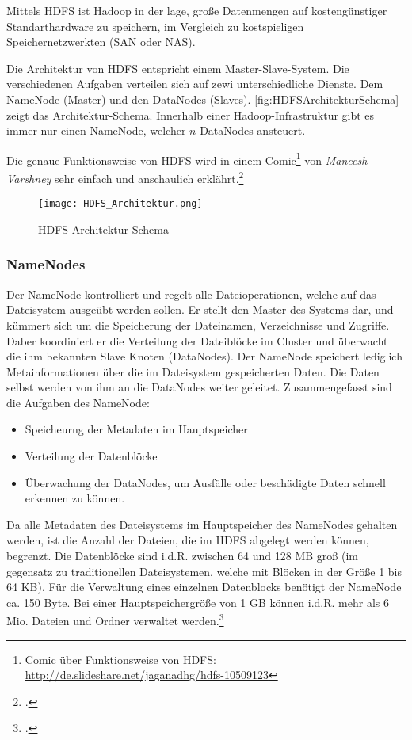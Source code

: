 Mittels \ac{HDFS} ist Hadoop in der lage, große Datenmengen auf kostengünstiger Standarthardware zu speichern, im Vergleich zu kostspieligen Speichernetzwerkten (\ac{SAN} oder \ac{NAS}). 

Die Architektur von \ac{HDFS} entspricht einem Master-Slave-System. Die verschiedenen Aufgaben verteilen sich auf zewi unterschiedliche Dienste. Dem NameNode (Master) und den DataNodes (Slaves). \autoref{fig:HDFSArchitekturSchema} zeigt das Architektur-Schema. Innerhalb einer Hadoop-Infrastruktur gibt es immer nur einen NameNode, welcher $n$ DataNodes ansteuert.

Die genaue Funktionsweise von \ac{HDFS} wird in einem Comic\footnote{Comic über Funktionsweise von HDFS: \\ \url{http://de.slideshare.net/jaganadhg/hdfs-10509123}} von \textit{Maneesh Varshney} sehr einfach und anschaulich erklährt.\footcite[Vgl.][S. 22 f.]{Wartala.2012}

\begin{figure}[h]
	\centering
	\texttt{[image: HDFS\_Architektur.png]}
	\caption{HDFS Architektur-Schema\footnotemark}
	\label{fig:HDFSArchitekturSchema}
\end{figure}

\subsubsection{NameNodes}
Der NameNode kontrolliert und regelt alle Dateioperationen, welche auf das Dateisystem ausgeübt werden sollen. Er stellt den Master des Systems dar, und kümmert sich um die Speicherung der Dateinamen, Verzeichnisse und Zugriffe. Daber koordiniert er die Verteilung der Dateiblöcke im Cluster und überwacht die ihm bekannten Slave Knoten (DataNodes). Der NameNode speichert lediglich Metainformationen über die im Dateisystem gespeicherten Daten. Die Daten selbst werden von ihm an die DataNodes weiter geleitet. Zusammengefasst sind die Aufgaben des NameNode:

\begin{itemize}
	\item Speicheurng der Metadaten im Hauptspeicher
	\item Verteilung der Datenblöcke
	\item Überwachung der DataNodes, um Ausfälle oder beschädigte Daten schnell erkennen zu können.
\end{itemize}

Da alle Metadaten des Dateisystems im Hauptspeicher des NameNodes gehalten werden, ist die Anzahl der Dateien, die im \ac{HDFS} abgelegt werden können, begrenzt. Die Datenblöcke sind i.d.R. zwischen 64 und 128 \ac{MB} groß (im gegensatz zu traditionellen Dateisystemen, welche mit Blöcken in der Größe 1 bis 64 \ac{KB}). Für die Verwaltung eines einzelnen Datenblocks benötigt der NameNode ca. 150 Byte. Bei einer Hauptspeichergröße von 1 \ac{GB} können i.d.R. mehr als 6 Mio. Dateien und Ordner verwaltet werden.\footcite[Vgl.][S. 24]{Wartala.2012}

